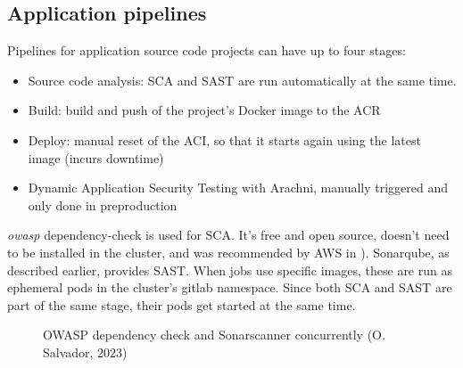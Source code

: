 \documentclass[11pt]{article}
\begin{document}
\begin{flushleft}
    \clearpage
    \subsection{Application pipelines}
    Pipelines for application source code projects can have up to four stages:
    
        \begin{itemize}
            \itemsep0em 
            \item Source code analysis: SCA and SAST are run automatically at the same time. 
    
            \item Build: build and push of the project's Docker image to the ACR
            
            \item Deploy: manual reset of the ACI, so that it starts again using the latest image (incurs downtime)

            \item Dynamic Application Security Testing with Arachni, manually triggered and only done in preproduction
    
        \end{itemize}

    \textit{\acrshort{owasp}} dependency-check is used for SCA. It's free and open source, doesn't need to be installed in the cluster, and was recommended by AWS in \cite{awsowasp}). Sonarqube, as described earlier, provides SAST. When jobs use specific images, these are run as ephemeral pods in the cluster's gitlab namespace. Since both SCA and SAST are part of the same stage, their pods get started at the same time.
    \linebreak
        
        \begin{figure}[htb]
            \centering
            \caption{OWASP dependency check and Sonarscanner concurrently (O. Salvador, 2023)}
        \end{figure}


\end{flushleft}
\end{document}
